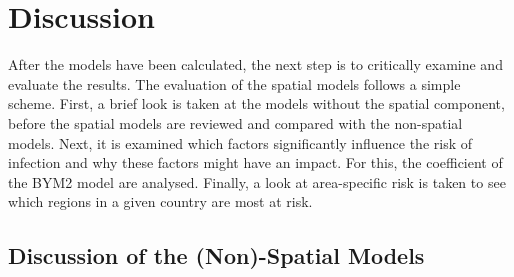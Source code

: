 %
\chapter{Discussion}\label{sec:discussion}
After the models have been calculated, the next step is to critically examine and evaluate the results. The evaluation of the spatial models follows a simple scheme. First, a brief look is taken at the models without the spatial component, before the spatial models are reviewed and compared with the non-spatial models. Next, it is examined which factors significantly influence the risk of infection and why these factors might have an impact. For this, the coefficient of the BYM2 model are analysed. Finally, a look at area-specific risk is taken to see which regions in a given country are most at risk.
\section{Discussion of the (Non)-Spatial Models}
